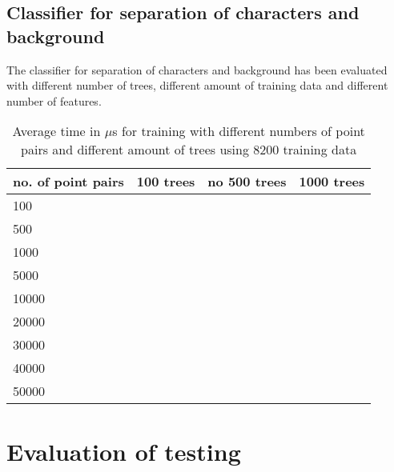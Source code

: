 \subsection{Classifier for separation of characters and background}
\label{sec:Classifier for separation of characters and background}
The classifier for separation of characters and background has been evaluated with different number of trees, different amount of training data and different number of features.

\begin{table}[H]
\begin{center}
     \begin{tabular}{ | l | l | l | l | }
     \hline
     no. of point pairs & 100 trees & no 500 trees & 1000 trees \\ \hline
   	 100 & & &  	\\ \hline
     500 & & &  	\\ \hline
     1000 & & &  \\ \hline
     5000 & & & 	\\ \hline
     10000 & & & 	\\ \hline
     20000 & & & 	\\ \hline
     30000 & & & 	\\ \hline
     40000 & & & 	\\ \hline
     50000 & & & 	\\ \hline
     \end{tabular}
\end{center}
\caption{Average time in $\mu$s for training with different numbers of point pairs and different amount of trees using 8200 training data}
\end{table}

\section{Evaluation of testing}
\label{sec:Evaluation of testing}
